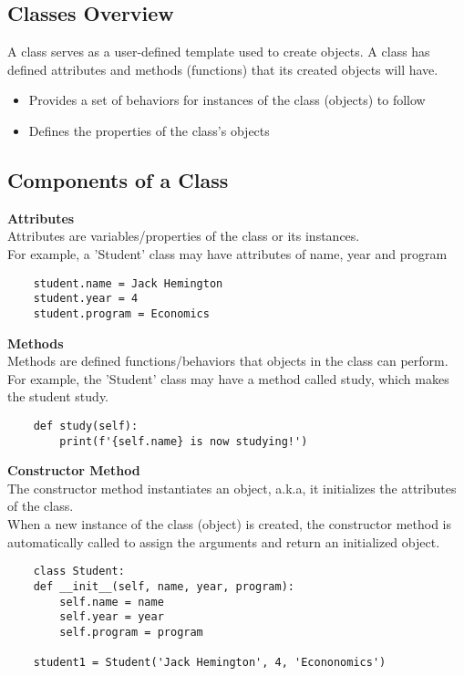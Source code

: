 \subsection{Classes Overview}
A class serves as a user-defined template used to create objects.
A class has defined attributes and methods (functions) that its created objects will have.
\begin{itemize}
    \item Provides a set of behaviors for instances of the class (objects) to follow
    \item Defines the properties of the class's objects
\end{itemize}


\subsection{Components of a Class}
\label{sec: class components}
\textbf{Attributes}\\
Attributes are variables/properties of the class or its instances.\\
For example, a 'Student' class may have attributes of name, year and program
\begin{verbatim}
    student.name = Jack Hemington
    student.year = 4
    student.program = Economics
\end{verbatim}

\textbf{Methods}\\
Methods are defined functions/behaviors that objects in the class can perform.
For example, the 'Student' class may have a method called study, which makes the student study.
\begin{verbatim}
    def study(self):
        print(f'{self.name} is now studying!')
\end{verbatim}

\textbf{Constructor Method}\\
The constructor method instantiates an object, a.k.a, it initializes the attributes of the class.\\
When a new instance of the class (object) is created, the constructor method is automatically called to assign the arguments and return an initialized object.
\begin{verbatim}
    class Student:
    def __init__(self, name, year, program):
        self.name = name
        self.year = year
        self.program = program

    student1 = Student('Jack Hemington', 4, 'Econonomics')
\end{verbatim}

